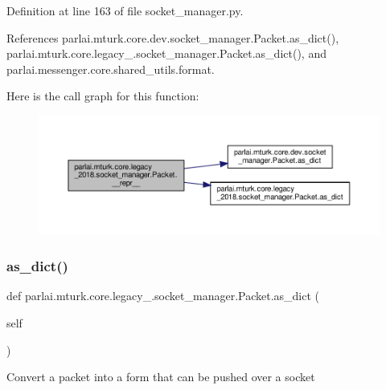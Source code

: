 Definition at line 163 of file socket\+\_\+manager.\+py.



References parlai.\+mturk.\+core.\+dev.\+socket\+\_\+manager.\+Packet.\+as\+\_\+dict(), parlai.\+mturk.\+core.\+legacy\+\_.\+socket\+\_\+manager.\+Packet.\+as\+\_\+dict(), and parlai.\+messenger.\+core.\+shared\+\_\+utils.\+format.

Here is the call graph for this function\+:
\nopagebreak
\begin{figure}[H]
\begin{center}
\leavevmode
\includegraphics[width=350pt]{classparlai_1_1mturk_1_1core_1_1legacy__2018_1_1socket__manager_1_1Packet_ab584329eae3598c36a1ae14a58be7e72_cgraph}
\end{center}
\end{figure}
\mbox{\label{classparlai_1_1mturk_1_1core_1_1legacy__2018_1_1socket__manager_1_1Packet_aa9cf63872aaa1f152fef9cdbe2069b17}} 
\subsubsection{\texorpdfstring{as\+\_\+dict()}{as\_dict()}}
{\footnotesize\ttfamily def parlai.\+mturk.\+core.\+legacy\+\_.\+socket\+\_\+manager.\+Packet.\+as\+\_\+dict (\begin{DoxyParamCaption}\item[{}]{self }\end{DoxyParamCaption})}

\begin{DoxyVerb}Convert a packet into a form that can be pushed over a socket\end{DoxyVerb}
 

